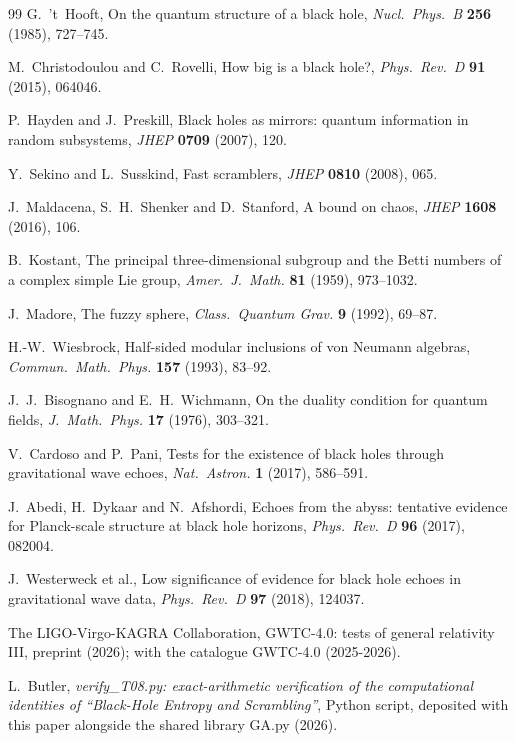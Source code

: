 \documentclass[11pt]{article}
\theoremstyle{definition}
\begin{document}
\begin{thebibliography}{99}
G.~'t~Hooft,
On the quantum structure of a black hole,
\emph{Nucl.\ Phys.\ B} \textbf{256} (1985), 727--745.

M.~Christodoulou and C.~Rovelli,
How big is a black hole?,
\emph{Phys.\ Rev.\ D} \textbf{91} (2015), 064046.

P.~Hayden and J.~Preskill,
Black holes as mirrors: quantum information in random subsystems,
\emph{JHEP} \textbf{0709} (2007), 120.

Y.~Sekino and L.~Susskind,
Fast scramblers,
\emph{JHEP} \textbf{0810} (2008), 065.

J.~Maldacena, S.~H.~Shenker and D.~Stanford,
A bound on chaos,
\emph{JHEP} \textbf{1608} (2016), 106.

B.~Kostant,
The principal three-dimensional subgroup and the Betti numbers of a complex simple Lie group,
\emph{Amer.\ J.\ Math.} \textbf{81} (1959), 973--1032.

J.~Madore,
The fuzzy sphere,
\emph{Class.\ Quantum Grav.} \textbf{9} (1992), 69--87.

H.-W.~Wiesbrock,
Half-sided modular inclusions of von Neumann algebras,
\emph{Commun.\ Math.\ Phys.} \textbf{157} (1993), 83--92.

J.~J.~Bisognano and E.~H.~Wichmann,
On the duality condition for quantum fields,
\emph{J.\ Math.\ Phys.} \textbf{17} (1976), 303--321.

V.~Cardoso and P.~Pani,
Tests for the existence of black holes through gravitational wave echoes,
\emph{Nat.\ Astron.} \textbf{1} (2017), 586--591.

J.~Abedi, H.~Dykaar and N.~Afshordi,
Echoes from the abyss: tentative evidence for Planck-scale structure at black hole horizons,
\emph{Phys.\ Rev.\ D} \textbf{96} (2017), 082004.

J.~Westerweck et al.,
Low significance of evidence for black hole echoes in gravitational wave data,
\emph{Phys.\ Rev.\ D} \textbf{97} (2018), 124037.

The LIGO-Virgo-KAGRA Collaboration,
GWTC-4.0: tests of general relativity III,
preprint (2026); with the catalogue GWTC-4.0 (2025-2026).

L.~Butler,
\emph{verify\_T08.py: exact-arithmetic verification of the computational identities of ``Black-Hole Entropy and Scrambling''},
Python script, deposited with this paper alongside the shared library GA.py (2026).

\end{thebibliography}
\end{document}
